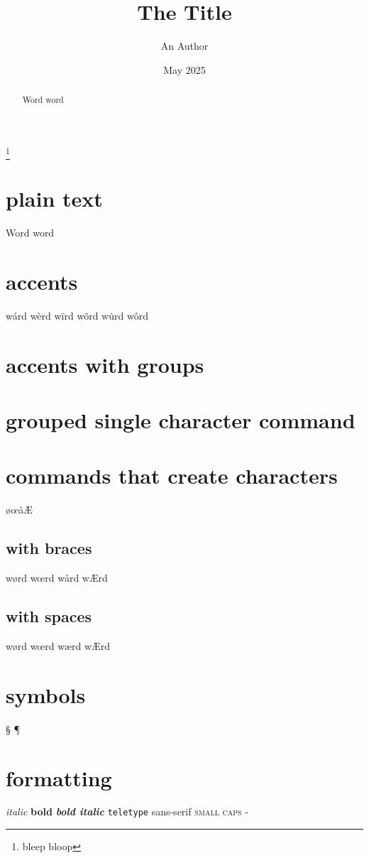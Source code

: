 \documentclass{article}
\title{The Title} %
\author{An Author} %
\date{May 2025} %
\begin{document}
\maketitle %

\thanks{bleep bloop}

\begin{abstract}
Word word %
\end{abstract}

\section{plain text}
Word word %

\section{accents}
w\'ard w\`erd w\"ird w\~ord w\.urd w\^ord %

\section{accents with groups}

\section{grouped single character command}

\section{commands that create characters}
\o\oe\aa\AE %

\subsection{with braces}
w\o{}rd w\oe{}rd w\aa{}rd w\AE{}rd %

\subsection{with spaces}
w\o rd w\oe rd w\ae rd w\AE rd %

\section{symbols}
\S{} \P{} %

\section{formatting}
\textit{italic} \textbf{bold} \textit{\textbf{bold italic}} %
\texttt{teletype} \textsf{sans-serif} \textsc{small caps} %
\textsf{-} %
\end{document}
